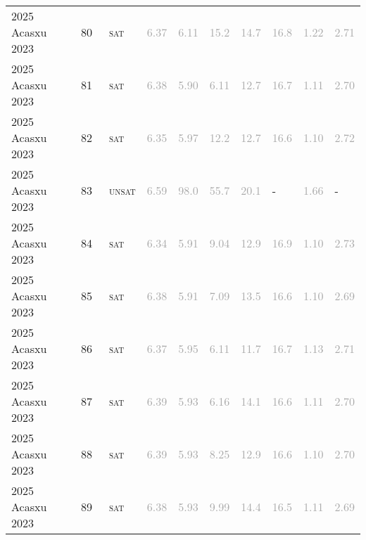 \begin{center}
{\begin{longtable}{@{}llllllllll@{}}
2025 Acasxu 2023 & 80 & ~\textsc{sat} & \textcolor{darkgray}{6.37} & \textcolor{darkgray}{6.11} & \textcolor{darkgray}{15.2} & \textcolor{darkgray}{14.7} & \textcolor{darkgray}{16.8} & \textcolor{darkgray}{1.22} & \textcolor{darkgray}{2.71} \\
2025 Acasxu 2023 & 81 & ~\textsc{sat} & \textcolor{darkgray}{6.38} & \textcolor{darkgray}{5.90} & \textcolor{darkgray}{6.11} & \textcolor{darkgray}{12.7} & \textcolor{darkgray}{16.7} & \textcolor{darkgray}{1.11} & \textcolor{darkgray}{2.70} \\
2025 Acasxu 2023 & 82 & ~\textsc{sat} & \textcolor{darkgray}{6.35} & \textcolor{darkgray}{5.97} & \textcolor{darkgray}{12.2} & \textcolor{darkgray}{12.7} & \textcolor{darkgray}{16.6} & \textcolor{darkgray}{1.10} & \textcolor{darkgray}{2.72} \\
2025 Acasxu 2023 & 83 & ~\textsc{unsat} & \textcolor{darkgray}{6.59} & \textcolor{darkgray}{98.0} & \textcolor{darkgray}{55.7} & \textcolor{darkgray}{20.1} & - & \textcolor{darkgray}{1.66} & - \\
2025 Acasxu 2023 & 84 & ~\textsc{sat} & \textcolor{darkgray}{6.34} & \textcolor{darkgray}{5.91} & \textcolor{darkgray}{9.04} & \textcolor{darkgray}{12.9} & \textcolor{darkgray}{16.9} & \textcolor{darkgray}{1.10} & \textcolor{darkgray}{2.73} \\
2025 Acasxu 2023 & 85 & ~\textsc{sat} & \textcolor{darkgray}{6.38} & \textcolor{darkgray}{5.91} & \textcolor{darkgray}{7.09} & \textcolor{darkgray}{13.5} & \textcolor{darkgray}{16.6} & \textcolor{darkgray}{1.10} & \textcolor{darkgray}{2.69} \\
2025 Acasxu 2023 & 86 & ~\textsc{sat} & \textcolor{darkgray}{6.37} & \textcolor{darkgray}{5.95} & \textcolor{darkgray}{6.11} & \textcolor{darkgray}{11.7} & \textcolor{darkgray}{16.7} & \textcolor{darkgray}{1.13} & \textcolor{darkgray}{2.71} \\
2025 Acasxu 2023 & 87 & ~\textsc{sat} & \textcolor{darkgray}{6.39} & \textcolor{darkgray}{5.93} & \textcolor{darkgray}{6.16} & \textcolor{darkgray}{14.1} & \textcolor{darkgray}{16.6} & \textcolor{darkgray}{1.11} & \textcolor{darkgray}{2.70} \\
2025 Acasxu 2023 & 88 & ~\textsc{sat} & \textcolor{darkgray}{6.39} & \textcolor{darkgray}{5.93} & \textcolor{darkgray}{8.25} & \textcolor{darkgray}{12.9} & \textcolor{darkgray}{16.6} & \textcolor{darkgray}{1.10} & \textcolor{darkgray}{2.70} \\
2025 Acasxu 2023 & 89 & ~\textsc{sat} & \textcolor{darkgray}{6.38} & \textcolor{darkgray}{5.93} & \textcolor{darkgray}{9.99} & \textcolor{darkgray}{14.4} & \textcolor{darkgray}{16.5} & \textcolor{darkgray}{1.11} & \textcolor{darkgray}{2.69} \\

\end{longtable}}
\end{center}

